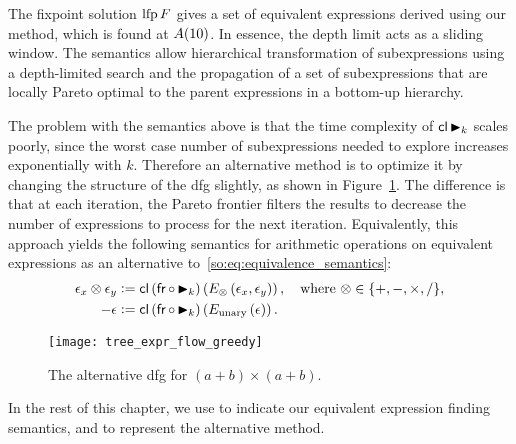 The fixpoint solution $\operatorname{\mathrm{lfp}} F$ gives a set of equivalent expressions derived
using our method, which is found at $A({10})$. In essence, the depth limit
acts as a sliding window.  The semantics allow hierarchical transformation of
subexpressions using a depth-limited search and the propagation of a set of
subexpressions that are locally Pareto optimal to the parent expressions in a
bottom-up hierarchy.

The problem with the semantics above is that the time complexity of $\operatorname{\mathsf{cl}}
\operatorname{\blacktriangleright}_k$ scales poorly, since the worst case number of subexpressions needed
to explore increases exponentially with $k$. Therefore an alternative method
is to optimize it by changing the structure of the \gls{dfg} slightly, as
shown in Figure~\ref{so:fig:tree_expr_flow_greedy}.  The difference is that
at each iteration, the Pareto frontier filters the results to decrease the
number of expressions to process for the next iteration.  Equivalently, this
approach yields the following semantics for arithmetic operations on equivalent
expressions as an alternative to~\eqref{so:eq:equivalence_semantics}:
\begin{equation}
    \begin{aligned}
        \epsilon_x \otimes \epsilon_y &\vcentcolon=
            \operatorname{\mathsf{cl}} \left( \operatorname{\mathsf{fr}} \circ \operatorname{\blacktriangleright}_k \right) \left(
                E_\otimes \left( \epsilon_x, \epsilon_y \right)
            \right), \quad\text{where~} \otimes\in\{ +, -, \times, / \}, \\
        -\epsilon &\vcentcolon=
            \operatorname{\mathsf{cl}} \left( \operatorname{\mathsf{fr}} \circ \operatorname{\blacktriangleright}_k \right) \left(
                E_{\mathrm{unary}} \left( \epsilon \right)
            \right).
    \end{aligned}
    \label{so:eq:equivalence_semantics_alt}
\end{equation}
\begin{figure}[ht]
    \centering
    \texttt{[image: tree\_expr\_flow\_greedy]}
    \caption{%
        The alternative \acrshort{dfg} for $(a + b) \times (a + b)$.
    }\label{so:fig:tree_expr_flow_greedy}
\end{figure}

In the rest of this chapter, we use \frontiertrace{} to indicate our equivalent
expression finding semantics, and \greedytrace{} to represent the alternative
method.


